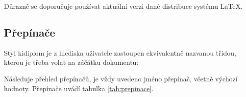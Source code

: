 \documentclass[
  program=itp,
  biblatex,
  figures=false,
  glossaries,
  index
]{kidiplom}
\begin{document}
Důrazně se doporučuje používat aktuální verzi dané distribuce systému \LaTeX{}.


\subsection{Přepínače}
Styl kidiplom je z hlediska uživatele zastoupen ekvivalentně nazvanou třídou, kterou je třeba volat na záčátku dokumentu:

Následuje přehled přepínačů, je vždy uvedeno jméno přepínač, včetně výchozí hodnoty. Přepínače uvádí tabulka \ref{tab:prepinace}.
\end{document}
